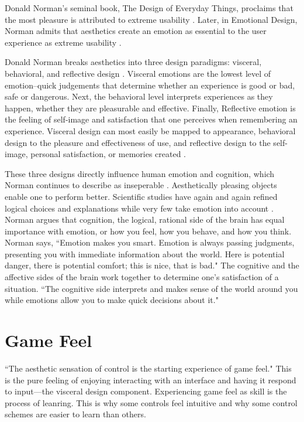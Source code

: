 Donald Norman's seminal book, The Design of Everyday Things, proclaims that the most pleasure is attributed to extreme usability \cite{norman2002design}. Later, in Emotional Design, Norman admits that aesthetics create an emotion as essential to the user experience as extreme usability \cite{norman2007emotional}.

Donald Norman breaks aesthetics into three design paradigms: visceral, behavioral, and reflective design \cite{norman2007emotional}. Visceral emotions are the lowest level of emotion--quick judgements that determine whether an experience is good or bad, safe or dangerous. Next, the behavioral level interprets experiences as they happen, whether they are pleasurable and effective. Finally, Reflective emotion is the feeling of self-image and satisfaction that one perceives when remembering an experience. Visceral design can most easily be mapped to appearance, behavioral design to the pleasure and effectiveness of use, and reflective design to the self-image, personal satisfaction, or memories created \cite{norman2007emotional}.

These three designs directly influence human emotion and cognition, which Norman continues to describe as inseperable \cite{norman2007emotional}. Aesthetically pleasing objects enable one to perform better. Scientific studies have again and again refined logical choices and explanations while very few take emotion into account \cite{norman2007emotional}. Norman argues that cognition, the logical, rational side of the brain has equal importance with emotion, or how you feel, how you behave, and how you think. Norman says, ``Emotion makes you smart. Emotion is always passing judgments, presenting you with immediate information about the world. Here is potential danger, there is potential comfort; this is nice, that is bad." \cite{norman2007emotional} The cognitive and the affective sides of the brain work together to determine one's satisfaction of a situation. ``The cognitive side interprets and makes sense of the world around you while emotions allow you to make quick decisions about it." \cite{norman2007emotional}

\section{Game Feel}

``The aesthetic sensation of control is the starting experience of game feel." \cite{swink2009game} This is the pure feeling of enjoying interacting with an interface and having it respond to input---the visceral design component. Experiencing game feel as skill is the process of leanring. This is why some controls feel intuitive and why some control schemes are easier to learn than others.

